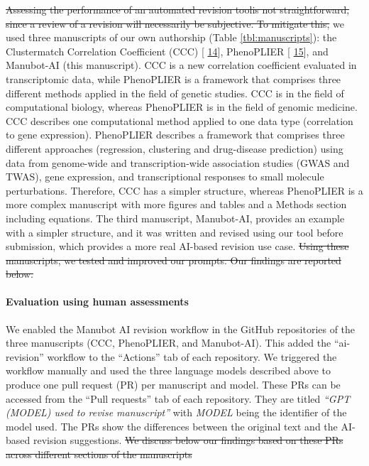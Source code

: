 \documentclass[
]{article}
\providecommand{\DIFaddtex}[1]{{\protect\color{blue}\uwave{#1}}} %
\providecommand{\DIFdeltex}[1]{{\protect\color{red}\sout{#1}}}                      %
\providecommand{\DIFaddbegin}{} %
\providecommand{\DIFaddend}{} %
\providecommand{\DIFdelbegin}{} %
\providecommand{\DIFdelend}{} %
\providecommand{\DIFadd}[1]{\texorpdfstring{\DIFaddtex{#1}}{#1}} %
\providecommand{\DIFdel}[1]{\texorpdfstring{\DIFdeltex{#1}}{}} %
\newcommand{\DIFscaledelfig}{0.5}
\newlength{\DIFdelgraphicswidth} %
\newlength{\DIFdelgraphicsheight} %
\newcommand{\DIFaddincludegraphics}[2][]{{\color{blue}\fbox{\DIFOincludegraphics[#1]{#2}}}} %
\newcommand{\DIFdelincludegraphics}[2][]{%
\sbox{\DIFdelgraphicsbox}{\DIFOincludegraphics[#1]{#2}}%
\settoboxwidth{\DIFdelgraphicswidth}{\DIFdelgraphicsbox} %
\settoboxtotalheight{\DIFdelgraphicsheight}{\DIFdelgraphicsbox} %
\scalebox{\DIFscaledelfig}{%
\parbox[b]{\DIFdelgraphicswidth}{\usebox{\DIFdelgraphicsbox}\\[-\baselineskip] \rule{\DIFdelgraphicswidth}{0em}}\llap{\resizebox{\DIFdelgraphicswidth}{\DIFdelgraphicsheight}{%
\setlength{\unitlength}{\DIFdelgraphicswidth}%
\begin{picture}(1,1)%
\thicklines\linethickness{2pt} %
{\color[rgb]{1,0,0}\put(0,0){\framebox(1,1){}}}%
{\color[rgb]{1,0,0}\put(0,0){\line( 1,1){1}}}%
{\color[rgb]{1,0,0}\put(0,1){\line(1,-1){1}}}%
\end{picture}%
}\hspace*{3pt}}} %
} %
\DeclareRobustCommand{\DIFaddbegin}{\DIFOaddbegin \let\includegraphics\DIFaddincludegraphics} %
\DeclareRobustCommand{\DIFaddend}{\DIFOaddend \let\includegraphics\DIFOincludegraphics} %
\DeclareRobustCommand{\DIFdelbegin}{\DIFOdelbegin \let\includegraphics\DIFdelincludegraphics} %
\DeclareRobustCommand{\DIFdelend}{\DIFOaddend \let\includegraphics\DIFOincludegraphics} %
\begin{document}
\DIFdelbegin \DIFdel{Assessing the performance of an automated revision toolis not straightforward, since a review of a revision will necessarily be subjective.
To mitigate this, }\DIFdelend \DIFaddbegin \DIFadd{For the evaluation of our tool, }\DIFaddend we used three manuscripts of our own authorship (Table \ref{tbl:manuscripts}): the Clustermatch Correlation Coefficient (CCC) {[}\protect\DIFdelbegin %
\DIFdelend \DIFaddbegin \hyperlink{ref-eirYTTyk}{14}{]}\DIFaddend , PhenoPLIER {[}\protect\DIFdelbegin %
\DIFdelend \DIFaddbegin \hyperlink{ref-NM3rHx1i}{15}{]}\DIFaddend , and Manubot-AI (this manuscript).
CCC is a new correlation coefficient evaluated in transcriptomic data, while PhenoPLIER is a framework that comprises three different methods applied in the field of genetic studies.
CCC is in the field of computational biology, whereas PhenoPLIER is in the field of genomic medicine.
CCC describes one computational method applied to one data type (correlation to gene expression).
PhenoPLIER describes a framework that comprises three different approaches (regression, clustering and drug-disease prediction) using data from genome-wide and transcription-wide association studies (GWAS and TWAS), gene expression, and transcriptional responses to small molecule perturbations.
Therefore, CCC has a simpler structure, whereas PhenoPLIER is a more complex manuscript with more figures and tables and a Methods section including equations.
The third manuscript, Manubot-AI, provides an example with a \DIFaddbegin \DIFadd{much }\DIFaddend simpler structure, and it was written and revised using our tool before submission, which provides a more real AI-based revision use case.
\DIFdelbegin \DIFdel{Using these manuscripts, we tested and improved our prompts.
Our findings are reported below.
}\DIFdelend 

\DIFaddbegin \hypertarget{evaluation-using-human-assessments}{%
\paragraph{Evaluation using human assessments}\label{evaluation-using-human-assessments}}

\DIFaddend We enabled the Manubot AI revision workflow in the GitHub repositories of the three manuscripts (CCC, PhenoPLIER, and Manubot-AI).
This added the ``ai-revision'' workflow to the ``Actions'' tab of each repository.
We triggered the workflow manually and used the three language models described above to produce one pull request (PR) per manuscript and model.
These PRs can be accessed from the ``Pull requests'' tab of each repository.
They are titled \emph{``GPT (MODEL) used to revise manuscript''} with \emph{MODEL} being the identifier of the model used.
The PRs show \DIFaddbegin \DIFadd{all }\DIFaddend the differences between the original text and the AI-based revision suggestions.
\DIFdelbegin \DIFdel{We discuss below our findings based on these PRs across different sections of the manuscripts}\DIFdelend \DIFaddbegin 
\end{document}
